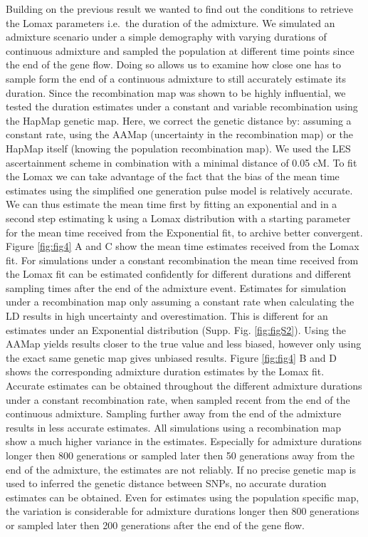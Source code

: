 \documentclass[]{article}
\begin{document}
Building on the previous
result we wanted to find out the conditions to retrieve the Lomax
parameters i.e.~the duration of the admixture. We simulated an admixture
scenario under a simple demography with varying durations of continuous
admixture and sampled the population at different time points since the
end of the gene flow. Doing so allows us to examine how close one has to
sample form the end of a continuous admixture to still accurately
estimate its duration. Since the recombination map was shown to be highly
influential, we tested the duration estimates under a constant and variable
recombination using the HapMap genetic map. Here, we correct the
genetic distance by: assuming a constant rate, using the AAMap (uncertainty in the recombination map) or the
HapMap itself (knowing the population recombination map). We used the LES ascertainment scheme in combination with
a minimal distance of 0.05 cM. To fit the Lomax we can take advantage of
the fact that the bias of the mean time estimates using the simplified
one generation pulse model is relatively accurate. We can thus estimate
the mean time first by fitting an exponential and in a second step estimating k
using a Lomax distribution with a starting parameter for the mean time received
from the Exponential fit, to archive better convergent. Figure \ref{fig:fig4} A and C show the mean
time estimates received from the Lomax fit. For simulations under a
constant recombination the mean time received from the Lomax fit can be estimated confidently for different durations and different sampling times after the end of the admixture event. Estimates for simulation under a recombination map only
assuming a constant rate when calculating the LD results in high uncertainty and overestimation. This is different for an estimates under an Exponential distribution (Supp. Fig.  \ref{fig:figS2}). Using the AAMap yields
results closer to the true value and less biased, however only
using the exact same genetic map gives unbiased results. Figure
\ref{fig:fig4} B and D shows the corresponding admixture duration estimates by the
Lomax fit. Accurate estimates can be obtained throughout the different
admixture durations under a constant recombination rate, when sampled
recent from the end of the continuous admixture. Sampling further away from the end of the admixture results in less accurate estimates.  All simulations using a recombination map show a much higher
variance in the estimates. Especially for admixture durations longer then
800 generations or sampled later then 50 generations away from the end
of the admixture, the estimates are not reliably. If no precise genetic map
is used to inferred the genetic distance between SNPs, no accurate
duration estimates can be obtained. Even for estimates using the population specific map, the variation is considerable for admixture durations longer then 800 generations or sampled later then 200 generations after the end of the gene flow.
\end{document}
